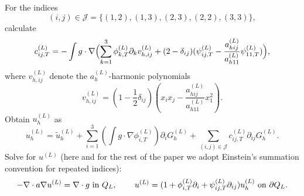 \documentclass[11pt]{article}
\begin{document}
\begin{algorithmic}
\begin{equation*}
\end{equation*}
\State For the indices \begin{equation*}
(i,j)\in \mathcal{J}=\{(1,2),(1,3),(2,3),(2,2),(3,3)\},\end{equation*} calculate \begin{equation*}
c_{ij,T}^{(L)}=-\int g\cdot \nabla \Bigl(\sum_{k=1}^3\phi_{k,T}^{(L)}\partial_k v_{h,ij}^{(L)}+(2-\delta_{ij})(\psi_{ij,T}^{(L)}-\dfrac{a_{hij}^{(L)}}{a_{h11}^{(L)}}\psi_{11,T}^{(L)})\Bigr) ,
\end{equation*} where $v_{h,ij}^{(L)}$ denote the $a_h^{(L)}$-harmonic polynomials \begin{equation*}
v_{h,ij}^{(L)}=(1-\dfrac{1}{2}\delta_{ij})(x_ix_j-\dfrac{a_{hij}^{(L)}}{a_{h11}^{(L)}}x_1^2).
\end{equation*}
\State Obtain $u_h^{(L)}$ as \begin{equation*}
u_h^{(L)}=\tilde{u}_h^{(L)}+ \sum_{i=1}^3(\int g \cdot\nabla \phi_{i,T}^{(L)})\partial_i G_h^{(L)} +\sum_{(i,j)\in\mathcal{J}}c_{ij,T}^{(L)}\partial_{ij} G_h^{(L)}.
\end{equation*}
\State Solve for $u^{(L)}$ (here and for the rest of the paper we adopt Einstein's summation convention for repeated indices): \begin{equation*}
-\nabla \cdot a \nabla u^{(L)}=\nabla \cdot g\text{ in }Q_L,\hspace{0.3in} u^{(L)}=(1+\phi_{i,T}^{(L)}\partial_i+\psi_{ij,T}^{(L)}\partial_{ij}) u_h^{(L)}\text{ on }\partial Q_L.
\end{equation*}
\end{algorithmic}
\end{document}
